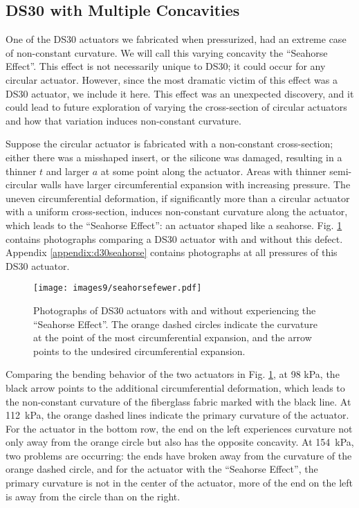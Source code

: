 \clearpage
\subsection{DS30 with Multiple Concavities}

One of the DS30 actuators we fabricated when pressurized, had an extreme case of non-constant curvature. We will call this varying concavity the ``Seahorse Effect''. This effect is not necessarily unique to DS30; it could occur for any circular actuator. However, since the most dramatic victim of this effect was a DS30 actuator, we include it here. This effect was an unexpected discovery, and it could lead to future exploration of varying the cross-section of circular actuators and how that variation induces non-constant curvature. 

Suppose the circular actuator is fabricated with a non-constant cross-section; either there was a misshaped insert, or the silicone was damaged, resulting in a thinner $t$ and larger $a$ at some point along the actuator. Areas with thinner semi-circular walls have larger circumferential expansion with increasing pressure. The uneven circumferential deformation, if significantly more than a circular actuator with a uniform cross-section, induces non-constant curvature along the actuator, which leads to the ``Seahorse Effect'': an actuator shaped like a seahorse. Fig. \ref{fig:seahorsefewer} contains photographs comparing a DS30 actuator with and without this defect. Appendix \ref{appendix:d30seahorse} contains photographs at all pressures of this DS30 actuator. 

\begin{figure}[!ht]
    \centering
     \texttt{[image: images9/seahorsefewer.pdf]}
    \caption{Photographs of DS30 actuators with and without experiencing the ``Seahorse Effect''. The orange dashed circles indicate the curvature at the point of the most circumferential expansion, and the arrow points to the undesired circumferential expansion.}
    \label{fig:seahorsefewer}
\end{figure}

Comparing the bending behavior of the two actuators in Fig. \ref{fig:seahorsefewer}, at 98 kPa, the black arrow points to the additional circumferential deformation, which leads to the non-constant curvature of the fiberglass fabric marked with the black line. At 112~kPa, the orange dashed lines indicate the primary curvature of the actuator. For the actuator in the bottom row, the end on the left experiences curvature not only away from the orange circle but also has the opposite concavity. At 154~kPa, two problems are occurring: the ends have broken away from the curvature of the orange dashed circle, and for the actuator with the ``Seahorse Effect'', the primary curvature is not in the center of the actuator, more of the end on the left is away from the circle than on the right. 

